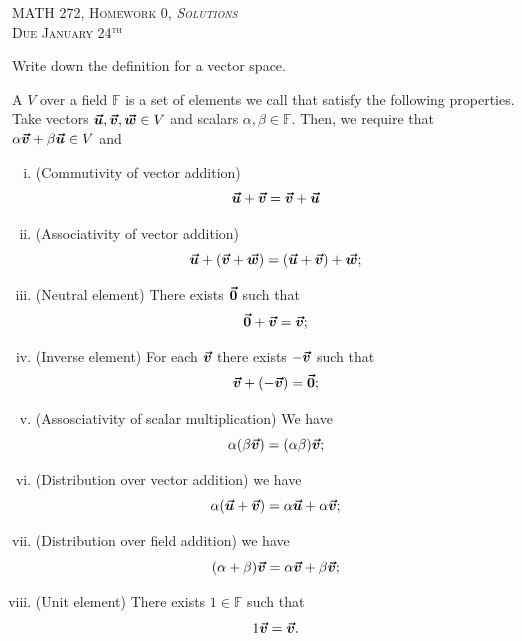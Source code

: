 \documentclass[12pt]{article} %
\begin{document}
\begin{center}
   \textsc{\large MATH 272, Homework 0, \emph{Solutions}}\\
   \textsc{Due January 24$^\textrm{th}$}
\end{center}

\begin{problem}
	Write down the definition for a vector space.  
\end{problem}
\begin{solution}
	     A  $V$ over a field $\mathbb{F}$ is a set of elements we call  that satisfy the following properties. Take vectors $\boldsymbol{\vec{u}},\boldsymbol{\vec{v}},\boldsymbol{\vec{w}} \in V$ and scalars $\alpha, \beta \in \mathbb{F}$. Then, we require that $\alpha\boldsymbol{\vec{v}} + \beta\boldsymbol{\vec{u}} \in V$ and 
	            \begin{enumerate}[(i)]
	                \item (Commutivity of vector addition)
	                \[
	                \boldsymbol{\vec{u}}+\boldsymbol{\vec{v}}=\boldsymbol{\vec{v}}+\boldsymbol{\vec{u}}
	                \]
	                \item (Associativity of vector addition)
	                \[
	                \boldsymbol{\vec{u}}+(\boldsymbol{\vec{v}}+\boldsymbol{\vec{w}})=(\boldsymbol{\vec{u}}+\boldsymbol{\vec{v}})+\boldsymbol{\vec{w}};
	                \]
	                \item (Neutral element) There exists $\boldsymbol{\vec{0}}$ such that
	                \[
	                \boldsymbol{\vec{0}}+\boldsymbol{\vec{v}}=\boldsymbol{\vec{v}};
	                \]
	                \item (Inverse element) For each $\boldsymbol{\vec{v}}$ there exists $-\boldsymbol{\vec{v}}$ such that
	                \[
	                \boldsymbol{\vec{v}}+(-\boldsymbol{\vec{v}})=\boldsymbol{\vec{0}};
	                \]                
	                \item (Assosciativity of scalar multiplication) We have
	                \[
	                \alpha(\beta \boldsymbol{\vec{v}})=(\alpha \beta)\boldsymbol{\vec{v}};
	                \]
	                \item (Distribution over vector addition) we have
	                \[
	                \alpha(\boldsymbol{\vec{u}}+\boldsymbol{\vec{v}})=\alpha \boldsymbol{\vec{u}} + \alpha \boldsymbol{\vec{v}};
	                \]
	                \item (Distribution over field addition) we have
	                \[
	                (\alpha+\beta)\boldsymbol{\vec{v}} = \alpha \boldsymbol{\vec{v}} + \beta \boldsymbol{\vec{v}};
	                \]
	                \item (Unit element) There exists $1\in \mathbb{F}$ such that
	                \[
	                1\boldsymbol{\vec{v}} = \boldsymbol{\vec{v}}.
	                \]
	            \end{enumerate}
\end{solution}	
\end{document}
